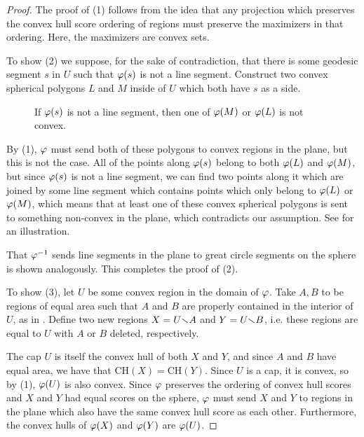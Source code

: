 \begin{proof}



		The proof of (1) follows from the idea that any projection which preserves the convex hull score ordering of regions must 
		preserve the maximizers in that ordering.   Here, the maximizers are convex sets.
		
		 To show (2) we suppose, for the sake of contradiction, that there is some geodesic segment $s$ in $U$ such that $\varphi(s)$ is not a line segment. Construct two convex spherical polygons $L$ and $M$ inside of $U$ which both have $s$ as a side. 










		

		
\begin{figure}[h]
	\centering
	
	\caption{If $\varphi(s)$ is not a line segment, then one of $\varphi(M)$ or $\varphi(L)$ is not convex.}
	\label{fig:lineconvexcont}
\end{figure}

		 By (1), $\varphi$ must send both of these polygons to convex regions in the plane, but this is not the case.  All of the points along $\varphi(s)$ belong to both $\varphi(L)$ and $\varphi(M)$, but since $\varphi(s)$ is not a line segment, we can find two points along it which are joined by some line segment which contains points which only belong to $\varphi(L)$ or $\varphi(M)$, which means that at least one of these convex spherical polygons is sent to something non-convex in the plane, which contradicts our assumption.		See  for an illustration.
		
		That $\varphi^{-1}$ sends line segments in the plane to great circle segments on the sphere is shown analogously.  
		This completes the proof of (2).
		
		
		
 To show (3), let $U$ be some convex region in the domain of $\varphi$.  Take $A,B$ to be regions of equal area such that $A$ and $B$ are properly contained in the interior of $U$, as in .  Define two new regions $X=U{\smallsetminus} A$ and $Y=U{\smallsetminus} B$, i.e. these regions are equal to $U$ with $A$ or $B$ deleted, respectively.  

The cap $U$ is itself the convex hull of both $X$ and $Y$, and since $A$ and $B$ have equal area, we have that $\mathrm{CH}(X) = \mathrm{CH}(Y)$.  Since $U$ is a cap, it is convex, so by (1), $\varphi(U)$ is also convex.  Since $\varphi$ preserves the ordering of convex hull scores and $X$ and $Y$ had equal scores on the sphere, $\varphi$ must send $X$ and $Y$ to regions in the plane which also have the same convex hull score as each other.  Furthermore, the convex hulls of $\varphi(X)$ and $\varphi(Y)$ are $\varphi(U)$.


\end{proof}
